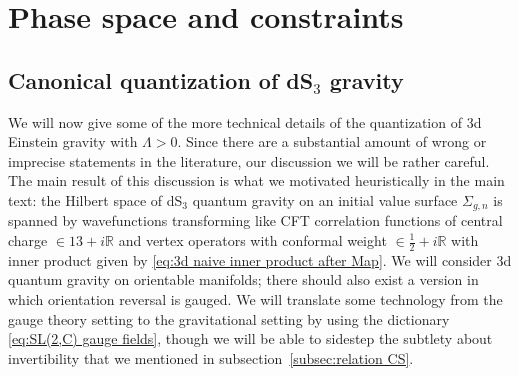 \documentclass[12pt,a4paper]{article}
\newcommand\RR{\mathbb{R}}
\begin{document}
 
\section{Phase space and constraints} \label{app: canonical quantization}
 \subsection{Canonical quantization of \texorpdfstring{dS$_3$}{dS3} gravity}
We will now give some of the more technical details of the quantization of 3d Einstein gravity with $\Lambda>0$. Since there are a substantial amount of wrong or imprecise statements in the literature, our discussion we will be rather careful. The main result of this discussion is what we motivated heuristically in the main text: the Hilbert space of dS$_3$ quantum gravity on an initial value surface $\Sigma_{g,n}$ is spanned by wavefunctions transforming like CFT correlation functions of central charge $\in 13+i \RR$ and vertex operators with conformal weight $\in \frac{1}{2}+i \RR$ with inner product given by \eqref{eq:3d naive inner product after Map}. We will consider 3d quantum gravity on orientable manifolds; there should also exist a version in which orientation reversal is gauged. 
We will translate some technology from the gauge theory setting to the gravitational setting by using the dictionary \eqref{eq:SL(2,C) gauge fields}, though we will be able to sidestep the subtlety about invertibility that we mentioned in subsection~\ref{subsec:relation CS}.
\end{document}
